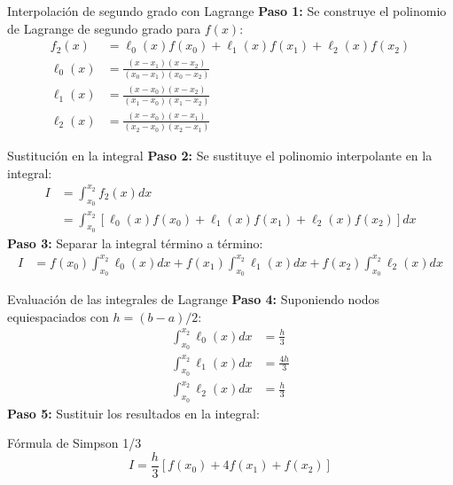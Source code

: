 \documentclass[main.tex]{subfiles}
\begin{document}
\begin{frame}{Interpolación de segundo grado con Lagrange}
\textbf{Paso 1:} Se construye el polinomio de Lagrange de segundo grado para $f(x)$:
\begin{align*}
  f_2(x) &= \ell_0(x) f(x_0) + \ell_1(x) f(x_1) + \ell_2(x) f(x_2) \\
  \ell_0(x) &= \frac{(x - x_1)(x - x_2)}{(x_0 - x_1)(x_0 - x_2)} \\
  \ell_1(x) &= \frac{(x - x_0)(x - x_2)}{(x_1 - x_0)(x_1 - x_2)} \\
  \ell_2(x) &= \frac{(x - x_0)(x - x_1)}{(x_2 - x_0)(x_2 - x_1)}
\end{align*}
\end{frame}

\begin{frame}{Sustitución en la integral}
\textbf{Paso 2:} Se sustituye el polinomio interpolante en la integral:
\begin{align*}
  I &= \int_{x_0}^{x_2} f_2(x) dx \\
    &= \int_{x_0}^{x_2} \left[ \ell_0(x) f(x_0) + \ell_1(x) f(x_1) + \ell_2(x) f(x_2) \right] dx
\end{align*}
\textbf{Paso 3:} Separar la integral término a término:
\begin{align*}
  I &= f(x_0) \int_{x_0}^{x_2} \ell_0(x) dx + f(x_1) \int_{x_0}^{x_2} \ell_1(x) dx + f(x_2) \int_{x_0}^{x_2} \ell_2(x) dx
\end{align*}
\end{frame}

\begin{frame}{Evaluación de las integrales de Lagrange}
\textbf{Paso 4:} Suponiendo nodos equiespaciados con $h = (b - a)/2$:
\begin{align*}
  \int_{x_0}^{x_2} \ell_0(x) dx &= \frac{h}{3} \\
  \int_{x_0}^{x_2} \ell_1(x) dx &= \frac{4h}{3} \\
  \int_{x_0}^{x_2} \ell_2(x) dx &= \frac{h}{3}
\end{align*}
\textbf{Paso 5:} Sustituir los resultados en la integral:
\begin{block}{Fórmula de Simpson 1/3}
\[ I = \frac{h}{3} \left[ f(x_0) + 4f(x_1) + f(x_2) \right] \]
\end{block}
\end{frame}
\end{document}
